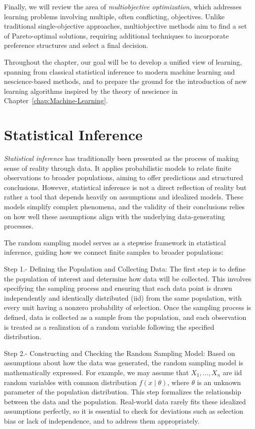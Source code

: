 Finally, we will review the area of \emph{multiobjective optimization}, which addresses learning problems involving multiple, often conflicting, objectives. Unlike traditional single-objective approaches, multiobjective methods aim to find a set of Pareto-optimal solutions, requiring additional techniques to incorporate preference structures and select a final decision.

Throughout the chapter, our goal will be to develop a unified view of learning, spanning from classical statistical inference to modern machine learning and nescience-based methods, and to prepare the ground for the introduction of new learning algorithms inspired by the theory of nescience in Chapter~\ref{chap:Machine-Learning}.

%
%

\section{Statistical Inference}

\emph{Statistical inference} has traditionally been presented as the process of making sense of reality through data. It applies probabilistic models to relate finite observations to broader populations, aiming to offer predictions and structured conclusions. However, statistical inference is not a direct reflection of reality but rather a tool that depends heavily on assumptions and idealized models. These models simplify complex phenomena, and the validity of their conclusions relies on how well these assumptions align with the underlying data-generating processes.

The random sampling model serves as a stepwise framework in statistical inference, guiding how we connect finite samples to broader populations:

Step 1.- Defining the Population and Collecting Data: The first step is to define the population of interest and determine how data will be collected. This involves specifying the sampling process and ensuring that each data point is drawn independently and identically distributed (iid) from the same population, with every unit having a nonzero probability of selection. Once the sampling process is defined, data is collected as a sample from the population, and each observation is treated as a realization of a random variable following the specified distribution.

Step 2.- Constructing and Checking the Random Sampling Model: Based on assumptions about how the data was generated, the random sampling model is mathematically expressed. For example, we may assume that $X_1, \ldots, X_n$ are iid random variables with common distribution $f(x \mid \theta)$, where $\theta$ is an unknown parameter of the population distribution. This step formalizes the relationship between the data and the population. Real-world data rarely fits these idealized assumptions perfectly, so it is essential to check for deviations such as selection bias or lack of independence, and to address them appropriately.

